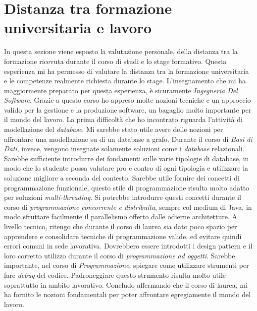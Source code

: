 \section{Distanza tra formazione universitaria e lavoro}
In questa sezione viene esposto la valutazione personale, della distanza tra la formazione ricevuta durante il corso di studi e lo stage formativo. Questa esperienza mi ha permesso di valutare la distanza tra la formazione universitaria e le competenze realmente richiesta durante lo stage.
L'insegnamento che mi ha maggiormente preparato per questa esperienza, è sicuramente \emph{Ingegneria Del Software}. Grazie a questo corso ho appreso molte nozioni tecniche e un approccio valido per la gestione e la produzione software, un bagaglio molto importante per il mondo del lavoro.
La prima difficoltà che ho incontrato riguarda l'attività di modellazione del \emph{database}. Mi sarebbe stato utile avere delle nozioni per affrontare una modellazione su di un database a grafo. Durante il corso di \emph{Basi di Dati}, invece, vengono insegnate solamente soluzioni come i \emph{database} relazionali. Sarebbe sufficiente introdurre dei fondamenti sulle varie tipologie di database, in modo che lo studente possa valutare pro e contro di ogni tipologia e utilizzare la soluzione migliore a seconda del contesto.
Sarebbe utile fornire dei concetti di programmazione funzionale, questo stile di programmazione risulta molto adatto per soluzioni \emph{multi-threading}. Si potrebbe introdurre questi concetti durante il corso di \emph{programmazione concorrente e distribuita}, sempre col medium di Java, in modo sfruttare facilmente il parallelismo offerto dalle odierne architetture.
A livello tecnico, ritengo che durante il corso di laurea sia dato poco spazio per apprendere e consolidare tecniche di programmazione valide, ed evitare quindi errori comuni in sede lavorativa. Dovrebbero essere introdotti i design pattern e il loro corretto utilizzo durante il corso di \emph{programmazione ad oggetti}.
Sarebbe importante, nel corso di \emph{Programmazione}, spiegare come utilizzare strumenti per fare \emph{debug} del codice. Padroneggiare questo strumento risulta molto utile soprattutto in ambito lavorativo.
Concludo affermando che il corso di laurea, mi ha fornito le nozioni fondamentali per poter affrontare egregiamente il mondo del lavoro.
